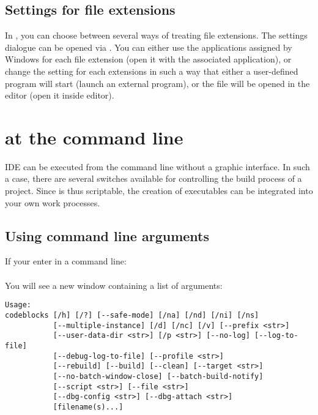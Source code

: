 \subsection{Settings for file extensions}\label{sec:file_extension}

In \codeblocks, you can choose between several ways of treating file extensions. The settings dialogue can be opened via .
You can either use the applications assigned by Windows for each file extension (open it with the associated application), or change the setting for each extensions in such a way that either a user-defined program will start (launch an external program), or the file will be opened in the \codeblocks editor (open it inside \codeblocks editor).


\section{\codeblocks at the command line}

IDE \codeblocks can be executed from the command line without a graphic interface. In such a case, there are several switches available for controlling the build process of a project. Since \codeblocks is thus scriptable, the creation of executables can be integrated into your own work processes.

\subsection{Using command line arguments}

If your enter in a command line:\\
\\
You will see a new window containing a list of arguments:
\begin{lstlisting}
Usage:
codeblocks [/h] [/?] [--safe-mode] [/na] [/nd] [/ni] [/ns]
           [--multiple-instance] [/d] [/nc] [/v] [--prefix <str>]
           [--user-data-dir <str>] [/p <str>] [--no-log] [--log-to-file]
           [--debug-log-to-file] [--profile <str>]
           [--rebuild] [--build] [--clean] [--target <str>]
           [--no-batch-window-close] [--batch-build-notify]
           [--script <str>] [--file <str>]
           [--dbg-config <str>] [--dbg-attach <str>]
           [filename(s)...]
\end{lstlisting}
           
